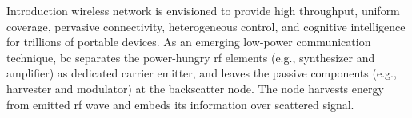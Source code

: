 \documentclass[journal]{IEEEtran}
\begin{document}
\glsresetall

\begin{section}{Introduction}
	 wireless network is envisioned to provide high throughput, uniform coverage, pervasive connectivity, heterogeneous control, and cognitive intelligence for trillions of portable devices.
	As an emerging low-power communication technique, \gls{bc} separates the power-hungry \gls{rf} elements (e.g., synthesizer and amplifier) as dedicated carrier emitter, and leaves the passive components (e.g., harvester and modulator) at the backscatter node.
	The node harvests energy from emitted \gls{rf} wave and embeds its information over scattered signal.





\end{section}
\end{document}
